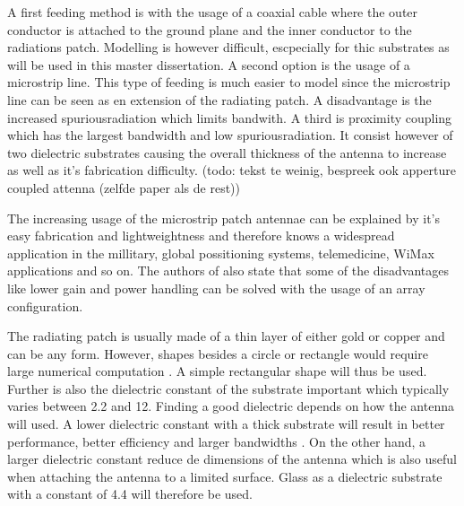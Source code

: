 A first feeding method is with the usage of a coaxial cable where the outer conductor is attached to the ground plane and the inner conductor to the radiations patch. Modelling is however difficult, escpecially for thic substrates as will be used in this master dissertation.
A second option is the usage of a microstrip line. This type of feeding is much easier to model since the microstrip line can be seen as en extension of the radiating patch.
A disadvantage is the increased \gls{spuriousradiation} which limits bandwith.
A third is proximity coupling which has the largest bandwidth and low \gls{spuriousradiation}. It consist however of two dielectric substrates causing the overall thickness
of the antenna to increase as well as it's fabrication difficulty.
(todo: tekst te weinig, bespreek ook apperture coupled attenna (zelfde paper als de rest))

The increasing usage of the microstrip patch antennae can be explained by it's easy fabrication and lightweightness and therefore knows a widespread application in the millitary, global possitioning systems, telemedicine, WiMax applications and so on.
The authors of \cite{J13_microstripadvantages} also state that some of the disadvantages like lower gain and power handling can be solved with the usage of an array configuration.

The radiating patch is usually made of a thin layer of either gold or copper \cite{J14_antennadesign,J15_antennadesign}
and can be any form. However, shapes besides a circle or rectangle would require large numerical computation \cite{J14_antennadesign}.
A simple rectangular shape will thus be used.
Further is also the dielectric constant of the substrate important which typically varies between 2.2 and 12. Finding a good dielectric depends on how the antenna will used. A lower
dielectric constant with a thick substrate will result in better performance, better efficiency and larger bandwidths  \cite{J15_antennadesign}.
On the other hand, a larger dielectric constant reduce de dimensions of the antenna \cite{J14_antennadesign}
which is also useful when attaching the 
antenna to a limited surface. Glass as a dielectric substrate with a constant of 4.4 will therefore be used.
